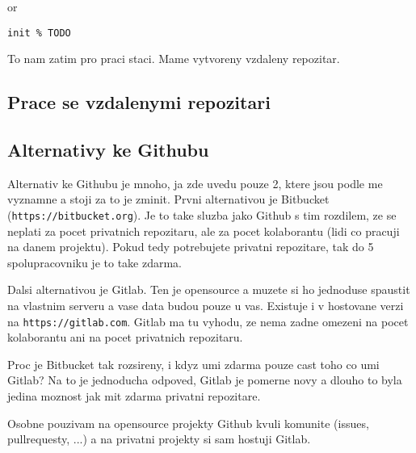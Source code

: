 \documentclass[12pt,a5paper]{article}
\begin{document}
or

\begin{lstlisting}
init % TODO
\end{lstlisting}

To nam zatim pro praci staci. Mame vytvoreny vzdaleny repozitar.

\subsection{Prace se vzdalenymi repozitari}

\subsection{Alternativy ke Githubu}

Alternativ ke Githubu je mnoho, ja zde uvedu pouze 2, ktere jsou podle me vyznamne a stoji za to je zminit. Prvni alternativou je Bitbucket (\lstinline|https://bitbucket.org|). Je to take sluzba jako Github s tim rozdilem, ze se neplati za pocet privatnich repozitaru, ale za pocet kolaborantu (lidi co pracuji na danem projektu). Pokud tedy potrebujete privatni repozitare, tak do 5 spolupracovniku je to take zdarma.

Dalsi alternativou je Gitlab. Ten je opensource a muzete si ho jednoduse spaustit na vlastnim serveru a vase data budou pouze u vas. Existuje i v hostovane verzi na \lstinline|https://gitlab.com|. Gitlab ma tu vyhodu, ze nema zadne omezeni na pocet kolaborantu ani na pocet privatnich repozitaru.

Proc je Bitbucket tak rozsireny, i kdyz umi zdarma pouze cast toho co umi Gitlab? Na to je jednoducha odpoved, Gitlab je pomerne novy a dlouho to byla jedina moznost jak mit zdarma privatni repozitare.

Osobne pouzivam na opensource projekty Github kvuli komunite (issues, pullrequesty, ...) a na privatni projekty si sam hostuji Gitlab.

\end{document}

